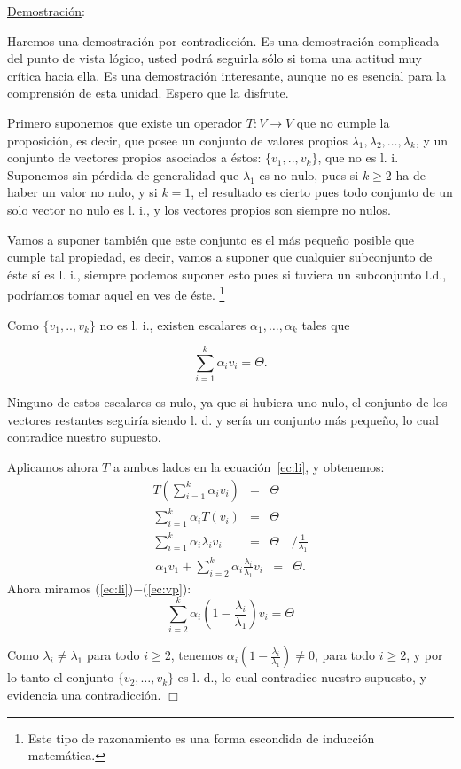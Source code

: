 \documentclass[12pt]{book}
\begin{document}
\underline{Demostración}: {\small
Haremos una demostración por contradicción.
Es una demostración complicada del punto de vista lógico, usted podrá seguirla sólo si toma una actitud muy crítica hacia ella.
Es una demostración interesante, aunque no es esencial para la comprensión de esta unidad.
Espero que la disfrute. 

Primero suponemos que existe un operador $T:V\rightarrow V$ que no cumple la proposición, es decir, que posee un conjunto de valores propios $\lambda_1,\lambda_2,\dots,\lambda_k$, y un conjunto de vectores propios asociados a éstos: $\{v_1,..,v_k\}$, que no es l. i.
Suponemos sin pérdida de generalidad que $\lambda_1$ es no nulo, pues si $k\ge 2$ ha de haber un valor no nulo, y si $k=1$, el resultado es cierto pues todo conjunto de un solo vector no nulo es l. i., y los vectores propios son siempre no nulos.

Vamos a suponer también que este conjunto es el más pequeño posible que cumple tal propiedad, es decir, vamos a suponer que cualquier subconjunto de éste sí es l. i., siempre podemos suponer esto pues si tuviera un subconjunto l.d., podríamos tomar aquel en ves de \'este.
\footnote{Este tipo de razonamiento es una forma escondida de inducción matemática.}

Como $\{v_1,..,v_k\}$ no es l. i., existen escalares $\alpha_1,\dots,\alpha_k$ tales que 

\begin{equation}\label{ec:li}
\sum_{i=1}^k \alpha_i v_i=\Theta.
\end{equation}

Ninguno de estos escalares es nulo, ya que si hubiera uno nulo, el conjunto de los vectores restantes seguiría siendo l. d. y sería un conjunto más pequeño, lo cual contradice nuestro supuesto.

Aplicamos ahora $T$ a ambos lados en la ecuación~\ref{ec:li}, y obtenemos:
\begin{eqnarray*}
T\left(\sum_{i=1}^k \alpha_iv_i\right)&=&\Theta\\
\sum_{i=1}^k \alpha_iT(v_i)&=&\Theta\\
\sum_{i=1}^k \alpha_i\lambda_iv_i&=&\Theta\quad /\frac{1}{\lambda_1}
\end{eqnarray*}
\begin{eqnarray}
\alpha_1v_1+\sum_{i=2}^k \alpha_i\frac{\lambda_i}{\lambda_1}v_i&=&\Theta.\label{ec:vp}
\end{eqnarray}
Ahora miramos (\ref{ec:li})$-$(\ref{ec:vp}):
$$\sum_{i=2}^k \alpha_i(1-\frac{\lambda_i}{\lambda_1})v_i=\Theta$$

Como $\lambda_i\not=\lambda_1$ para todo $i\ge2$, tenemos $\alpha_i(1-\frac{\lambda_i}{\lambda_1})\not = 0$, para todo $i\ge 2$, y por lo tanto el conjunto $\{v_2,\dots,v_k\}$ es l. d., lo cual contradice nuestro supuesto, y evidencia una contradicción.
\hfill $\Box$
}
\end{document}
